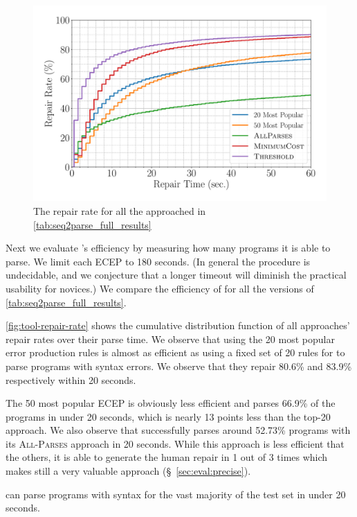 \begin{figure}[t]
  \centering
  \includegraphics[width=0.7\linewidth]{tool-repair-rate.pdf}
  \caption{The repair rate for all the approached in
  \autoref{tab:seq2parse_full_results}}
  \label{fig:tool-repair-rate}
\end{figure}

Next we evaluate \toolname's efficiency by measuring how many programs it is
able to parse. We limit each ECEP to 180 seconds. (In general the procedure is
undecidable, and we conjecture that a longer timeout will diminish the practical
usability for novices.) We compare the efficiency of \toolname for all the
versions of \autoref{tab:seq2parse_full_results}.

\autoref{fig:tool-repair-rate} shows the cumulative distribution function of all
\toolname approaches' repair rates over their parse time. We observe that using
the 20 most popular error production rules is almost as efficient as using a
fixed set of 20 rules for \toolname to parse programs with syntax errors. We
observe that they repair 80.6\% and 83.9\% respectively within 20 seconds.

The 50 most popular ECEP is obviously less efficient and parses 66.9\% of the
programs in under 20 seconds, which is nearly 13 points less than the top-20
approach. We also observe that \toolname successfully parses around 52.73\%
programs with its \textsc{All-Parses} approach in 20 seconds. While this
approach is less efficient that the others, it is able to generate the human
repair in 1 out of 3 times which makes still a very valuable approach
(\S~\ref{sec:eval:precise}).

\begin{framed}
  \noindent \toolname can parse programs with syntax for the vast majority of
  the test set in under 20 seconds.
\end{framed}

